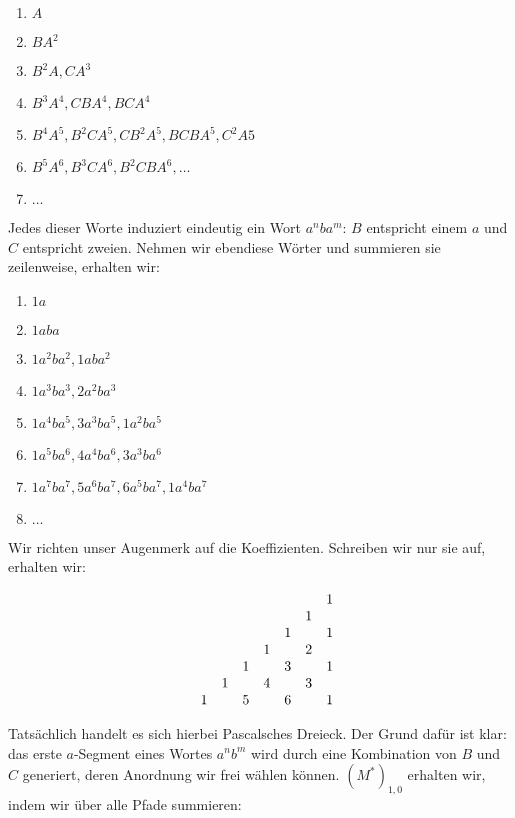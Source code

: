 \documentclass[]{scrartcl}
\newcommand{\mt}[1]{\textnormal{#1}}
\begin{document}
\begin{enumerate}
	\begin{enumerate}
		\item $A$
		\item $BA^2$
		\item $B^2A, CA^3$
		\item $B^3A^4, CBA^4, BCA^4$
		\item $B^4A^5, B^2CA^5, CB^2A^5, BCBA^5, C^2A5$
		\item $B^5A^6, B^3CA^6, B^2CBA^6, \dots$
		\item $\dots$
	\end{enumerate}
	
	Jedes dieser Worte induziert eindeutig ein Wort $a^nba^m$: $B$ entspricht einem $a$ und $C$ entspricht zweien. Nehmen wir ebendiese Wörter und summieren sie zeilenweise, erhalten wir:
	
	\begin{enumerate}
		\item $1a$
		\item $1aba$
		\item $1a^2ba^2, 1aba^2$
		\item $1a^3ba^3, 2a^2ba^3$
		\item $1a^4ba^5, 3a^3ba^5, 1a^2ba^5$
		\item $1a^5ba^6, 4a^4ba^6, 3a^3ba^6$
		\item $1a^7ba^7, 5a^6ba^7, 6a^5ba^7, 1a^4ba^7$
		\item $\dots$
	\end{enumerate}
	
	
	Wir richten unser Augenmerk auf die Koeffizienten. Schreiben wir nur sie auf, erhalten wir:
	
	$$
	\begin{array}{l l l l l l l l l}
		  &   &   &   &   &   &   & 1\\
		  &   &   &   &   &   & 1 & \\
		  &   &   &   &   & 1 &   & 1\\
		  &   &   &   & 1 &   & 2 &  \\
		  &   &   & 1 &   & 3 &   & 1\\
		  &   & 1 &   & 4 &   & 3 & \\
		  & 1 &   & 5 &   & 6 &   & 1\\
	\end{array}
	$$
	
	Tatsächlich handelt es sich hierbei Pascalsches Dreieck. Der Grund dafür ist klar: das erste $a$-Segment eines Wortes $a^nb^m$ wird durch eine Kombination von $B$ und $C$ generiert, deren Anordnung wir frei wählen können.
	$(M^*)_{1,0}$ erhalten wir, indem wir über alle Pfade summieren:
	

\end{enumerate}
\end{document}
